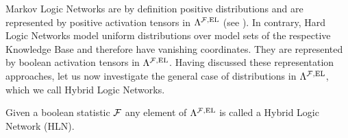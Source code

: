 %
%




\label{sec:hybridNetworks}

Markov Logic Networks are by definition positive distributions and are represented by positive activation tensors in $\Lambda^{\mathcal{F},\mathrm{EL}}$ (see ).
In contrary, Hard Logic Networks model uniform distributions over model sets of the respective Knowledge Base and therefore have vanishing coordinates.
They are represented by boolean activation tensors in $\Lambda^{\mathcal{F},\mathrm{EL}}$.
Having discussed these representation approaches, let us now investigate the general case of distributions in $\Lambda^{\mathcal{F},\mathrm{EL}}$, which we call Hybrid Logic Networks.


\begin{definition}
    \label{def:hln}
    Given a boolean statistic $\mathcal{F}$ %
    any element of $\Lambda^{\mathcal{F},\mathrm{EL}}$ is called a Hybrid Logic Network (HLN).
\end{definition}

